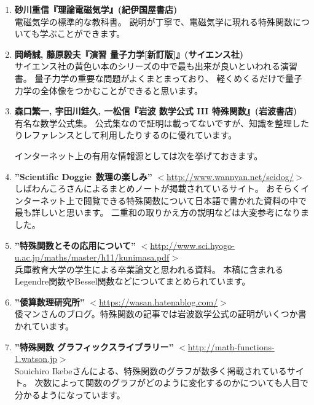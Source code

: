 \documentclass[../main/main]{subfiles}
\begin{document}
\begin{enumerate}
  \item \textbf{砂川重信『理論電磁気学』(紀伊国屋書店)}\\
  電磁気学の標準的な教科書。
  説明が丁寧で、電磁気学に現れる特殊関数についても学ぶことができます。\vspace{6pt}

  \item \textbf{岡崎誠, 藤原毅夫『演習 量子力学[新訂版]』(サイエンス社)}\\
  サイエンス社の黄色い本のシリーズの中で最も出来が良いといわれる演習書。
  量子力学の重要な問題がよくまとまっており、
  軽くめくるだけで量子力学の全体像をつかむことができると思います。\vspace{6pt}
  \item \textbf{森口繁一, 宇田川銈久, 一松信『岩波 数学公式 III 特殊関数』(岩波書店)} \\
  有名な数学公式集。
  公式集なので証明は載ってないですが、知識を整理したりレファレンスとして利用したりするのに優れています。
  
  \vspace{12pt}
  インターネット上の有用な情報源としては次を挙げておきます。\vspace{6pt}

  \item \textbf{''Scientific Doggie 数理の楽しみ''} $<$\url{http://www.wannyan.net/scidog/}$>$\\
  しばわんころさんによるまとめノートが掲載されているサイト。
  おそらくインターネット上で閲覧できる特殊関数について日本語で書かれた資料の中で最も詳しいと思います。
  二重和の取りかえ方の説明などは大変参考になりました。\vspace{6pt}

  \item \textbf{''特殊関数とその応用について''} 
		$<$\url{http://www.sci.hyogo-u.ac.jp/maths/master/h11/kunimasa.pdf}$>$\\
  兵庫教育大学の学生による卒業論文と思われる資料。
  本稿に含まれるLegendre関数やBessel関数などについてまとめられています。\vspace{6pt}

  \item \textbf{''倭算数理研究所''} $<$\url{https://wasan.hatenablog.com/}$>$\\
  倭マンさんのブログ。特殊関数の記事では岩波数学公式の証明がいくつか書かれています。\vspace{6pt}

  \item \textbf{''特殊関数 グラフィックスライブラリー''} $<$\url{http://math-functions-1.watson.jp}$>$\\
  Souichiro Ikebeさんによる、特殊関数のグラフが数多く掲載されているサイト。
  次数によって関数のグラフがどのように変化するのかについても人目で分かるようになっています。\vspace{6pt}


\end{enumerate}
\end{document}
